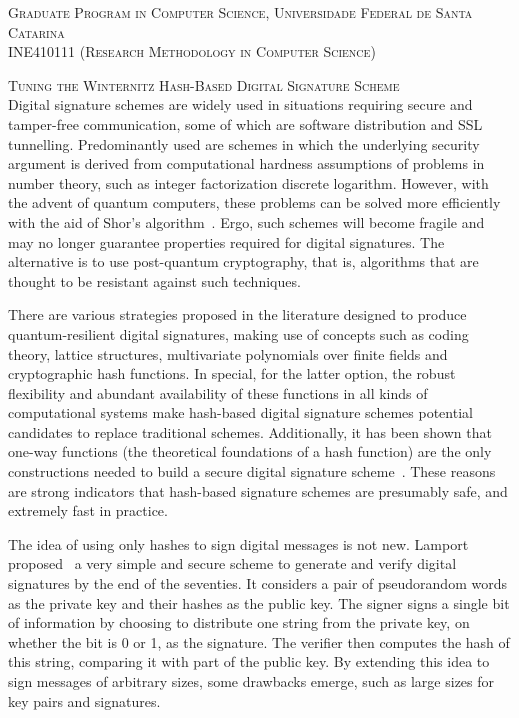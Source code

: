 \documentclass[12pt]{article}
\begin{document}
\textsc{Graduate Program in Computer Science,
  Universidade Federal de Santa Catarina} \\
\textsc{INE410111 (Research Methodology in Computer Science)}

\textsc{Tuning the Winternitz Hash-Based Digital Signature Scheme} \\

Digital signature schemes are widely used in situations requiring secure and
tamper-free communication, some of which are software distribution and SSL
tunnelling. Predominantly used are schemes in which the underlying security
argument is derived from computational hardness assumptions of problems in
number theory, such as integer factorization discrete logarithm. However, with
the advent of quantum computers, these problems can be solved more efficiently
with the aid of Shor's algorithm~\cite{Shor:article:1997:oct}. Ergo, such
schemes will become fragile and may no longer guarantee properties required for
digital signatures. The alternative is to use post-quantum cryptography, that
is, algorithms that are thought to be resistant against such techniques.

There are various strategies proposed in the literature designed to produce
quantum-resilient digital signatures, making use of concepts such as coding
theory, lattice structures, multivariate polynomials over finite fields and
cryptographic hash functions. In special, for the latter option, the robust
flexibility and abundant availability of these functions in all kinds of
computational systems make hash-based digital signature schemes potential
candidates to replace traditional schemes. Additionally, it has been shown that
one-way functions (the theoretical foundations of a hash function) are the only
constructions needed to build a secure digital signature
scheme~\cite{Rompel:inproc:1990:may}. These reasons are strong indicators that
hash-based signature schemes are presumably safe, and extremely fast in
practice.

The idea of using only hashes to sign digital messages is not new. Lamport
proposed~\cite{Lamport:report:1979:oct} a very simple and secure scheme to
generate and verify digital signatures by the end of the seventies. It
considers a pair of pseudorandom words as the private key and their hashes as
the public key. The signer signs a single bit of information by choosing to
distribute one string from the private key, on whether the bit is 0 or 1, as
the signature. The verifier then computes the hash of this string, comparing it
with part of the public key. By extending this idea to sign messages of
arbitrary sizes, some drawbacks emerge, such as large sizes for key pairs and
signatures.
\end{document}
